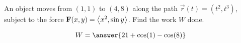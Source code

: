 \documentclass{ximera}
\author{David Guichard \and Neal Koblitz \and H. Jerome Keisler \and Albert Scheller \and Barry Balof \and Mike Wills \and Matthew Carr}
\begin{document}
\begin{exercise}




An object moves from $(1,1)$ to $(4,8)$ along the path $\vec{r}(t)=(t^2,t^3)$, subject to the force $\mathbf{F}(x,y)=\left\langle x^2,\sin y\right\rangle$. Find the work $W$ done.
\begin{prompt}
\[
W=\answer{21+\cos(1)-\cos(8)}
\]
\end{prompt}



\end{exercise}
\end{document}
